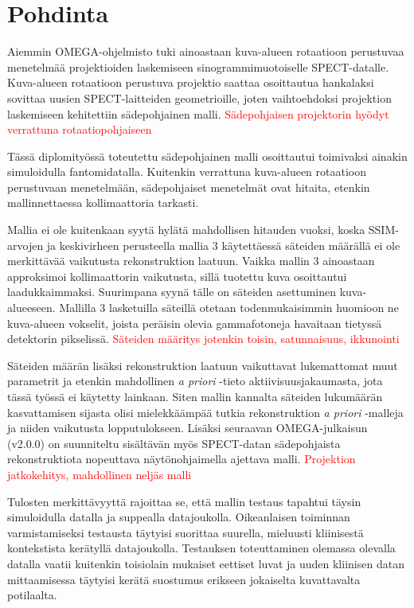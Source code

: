 \section{Pohdinta}
Aiemmin OMEGA-ohjelmisto tuki ainoastaan kuva-alueen rotaatioon perustuvaa menetelmää projektioiden laskemiseen sinogrammimuotoiselle SPECT-datalle. Kuva-alueen rotaatioon perustuva projektio saattaa osoittautua hankalaksi sovittaa uusien SPECT-laitteiden geometrioille, joten vaihtoehdoksi projektion laskemiseen kehitettiin sädepohjainen malli. \textcolor{red}{Sädepohjaisen projektorin hyödyt verrattuna rotaatiopohjaiseen}

Tässä diplomityössä toteutettu sädepohjainen malli osoittautui toimivaksi ainakin simuloidulla fantomidatalla. Kuitenkin verrattuna kuva-alueen rotaatioon perustuvaan menetelmään, sädepohjaiset menetelmät ovat hitaita, etenkin mallinnettaessa kollimaattoria tarkasti.

Mallia ei ole kuitenkaan syytä hylätä mahdollisen hitauden vuoksi, koska SSIM-arvojen ja keskivirheen perusteella mallia 3 käytettäessä säteiden määrällä ei ole merkittävää vaikutusta rekonstruktion laatuun. Vaikka mallin 3 ainoastaan approksimoi kollimaattorin vaikutusta, sillä tuotettu kuva osoittautui laadukkaimmaksi. Suurimpana syynä tälle on säteiden asettuminen kuva-alueeseen. Mallilla 3 lasketuilla säteillä otetaan todenmukaisimmin huomioon ne kuva-alueen vokselit, joista peräisin olevia gammafotoneja havaitaan tietyssä detektorin pikselissä. \textcolor{red}{Säteiden määritys jotenkin toisin, satunnaisuus, ikkunointi}

Säteiden määrän lisäksi rekonstruktion laatuun vaikuttavat lukemattomat muut parametrit ja etenkin mahdollinen \textit{a priori} -tieto aktiivisuusjakaumasta, jota tässä työssä ei käytetty lainkaan. Siten mallin kannalta säteiden lukumäärän kasvattamisen sijasta olisi mielekkäämpää tutkia rekonstruktion \textit{a priori} -malleja ja niiden vaikutusta lopputulokseen. Lisäksi seuraavan OMEGA-julkaisun (v2.0.0) on suunniteltu sisältävän myös SPECT-datan sädepohjaista rekonstruktiota nopeuttava näytönohjaimella ajettava malli. \textcolor{red}{Projektion jatkokehitys, mahdollinen neljäs malli}

Tulosten merkittävyyttä rajoittaa se, että mallin testaus tapahtui täysin simuloidulla datalla ja suppealla datajoukolla. Oikeanlaisen toiminnan varmistamiseksi testausta täytyisi suorittaa suurella, mieluusti kliinisestä kontekstista kerätyllä datajoukolla. Testauksen toteuttaminen olemassa olevalla datalla vaatii kuitenkin toisiolain mukaiset eettiset luvat ja uuden kliinisen datan mittaamisessa täytyisi kerätä suostumus erikseen jokaiselta kuvattavalta potilaalta.